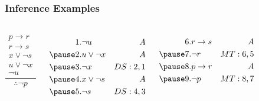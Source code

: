 \documentclass[dvipsnames]{beamer}
\begin{document}
\begin{frame}
  \frametitle{Inference Examples}

  \begin{columns}[t]
    \[
    \frac
      {
        \begin{array}{c}
          p \rightarrow r\\
          r \rightarrow s\\
          x \vee \neg s\\
          u \vee \neg x\\
          \neg u
        \end{array}
      }
      {
        \therefore \neg p
      }
    \]

    \pause
    \begin{eqnarray*}
      1. & \neg u          & A\\
      \pause
      2. & u \vee \neg x   & A\\
      \pause
      3. & \neg x          & DS:2,1\\
      \pause
      4. & x \vee \neg s   & A\\
      \pause
      5. & \neg s          & DS:4,3\\
    \end{eqnarray*}

    \pause
    \begin{eqnarray*}
      6. & r \rightarrow s & A\\
      \pause
      7. & \neg r          & MT:6,5\\
      \pause
      8. & p \rightarrow r & A\\
      \pause
      9. & \neg p          & MT:8,7\\
    \end{eqnarray*}
  \end{columns}
\end{frame}
\end{document}

